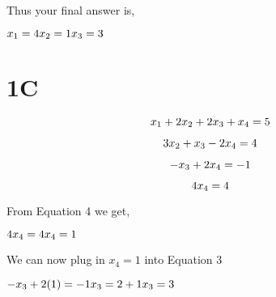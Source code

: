 \documentclass{article}
\begin{document}
\raggedright Thus your final answer is, 

    \begin{math}
        x_1 = 4 \newline
        x_2 = 1 \newline
        x_3 = 3 
    \end{math}



    \section*{1C}   

    \setcounter{equation}{0} %
    
    \begin{equation} %
        \raggedright x_1 + 2x_2 + 2x_3 + x_4 = 5
    \end{equation}

    \begin{equation} %
        \raggedright 3x_2 + x_3 - 2x_4 = 4
    \end{equation}

    \begin{equation} %
        \raggedright -x_3 + 2x_4 = -1 
    \end{equation}

    \begin{equation} %
        \raggedright 4x_4 = 4 
    \end{equation}

\raggedright From Equation 4 we get, \newline

    \begin{math}
         4x_4 = 4 
         \newline %
         x_4 = 1 
         \newline
    \end{math} \newline

\raggedright We can now plug in  \begin{math} x_4 = 1 \end{math} into Equation 3 \newline

    \begin{math}
         -x_3 + 2(1) = -1  
         \newline 
         x_3 = 2 + 1
         \newline
         x_3 = 3
    \end{math} \newline
\end{document}
